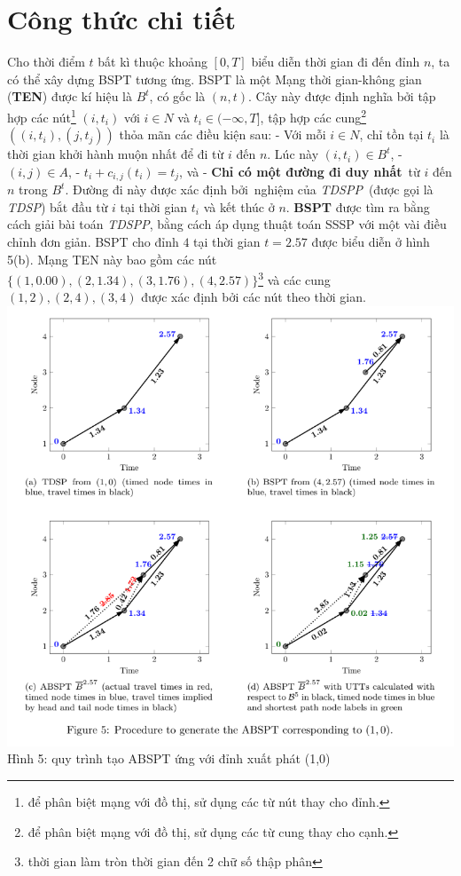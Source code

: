 \documentclass[14pt,oneside]{scrbook}
\begin{document}
\section{Công thức chi tiết}\label{cuxf4ng-thux1ee9c-chi-tiux1ebft}

Cho thời điểm \(t\) bất kì thuộc khoảng \([0, T]\) biểu diễn thời gian
đi đến đỉnh \(n\), ta có thể xây dựng BSPT tương ứng. BSPT là một Mạng
thời gian-không gian (\textbf{TEN}) được kí hiệu là \(B^t\), có gốc là
\((n, t)\). Cây này được định nghĩa bởi tập hợp các nút\footnote{để phân
  biệt mạng với đồ thị, sử dụng các từ nút thay cho đỉnh.} \((i, t_i)\)
với \(i \in N\) và \(t_i \in (-\infty, T]\), tập hợp các cung\footnote{để
  phân biệt mạng với đồ thị, sử dụng các từ cung thay cho cạnh.}
\(((i, t_i), (j, t_j))\) thỏa mãn các điều kiện sau: - Với mỗi
\(i\in N\), chỉ tồn tại \(t_i\) là thời gian khởi hành muộn nhất để đi
từ \(i\) đến \(n\). Lúc này \((i, t_i)\in B^t\), - \((i, j) \in A\), -
\(t_i + c_{i, j}(t_i) = t_j\), và - \textbf{Chỉ có một đường đi duy
nhất}~từ \(i\) đến \(n\) trong \(B^t\). Đường đi này được xác định
bởi~nghiệm của \emph{TDSPP}~(được gọi là \emph{TDSP}) bắt đầu từ \(i\)
tại thời gian \(t_i\) và kết thúc ở \(n\). \textbf{BSPT} được tìm ra
bằng cách giải bài toán \emph{TDSPP}, bằng cách áp dụng thuật toán SSSP
với một vài điều chỉnh đơn giản. BSPT cho đỉnh \(4\) tại thời gian
\(t=2.57\) được biểu diễn ở hình 5(b). Mạng TEN này bao gồm các nút
\(\{(1, 0.00), (2, 1.34), (3, 1.76), (4, 2.57)\}\)\footnote{thời gian
  làm tròn thời gian đến 2 chữ số thập phân} và các cung
\((1, 2), (2, 4), (3, 4)\) được xác định bởi các nút theo thời gian.
\includegraphics{images/Figure5.png} Hình 5: quy trình tạo ABSPT ứng với
đỉnh xuất phát (1,0)
\end{document}
